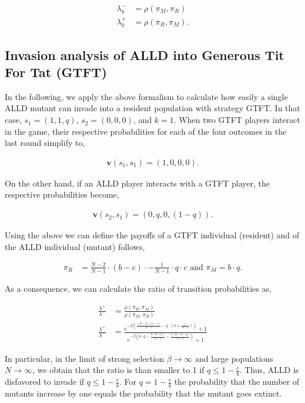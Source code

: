 \documentclass[11pt]{article}
\theoremstyle{plainCl1}
\theoremstyle{plainCl2}
\begin{document}
\begin{align*} 
  \lambda^-_k &\!=\!\rho(\pi_M, \pi_R) \\
  \lambda^+_k &\!=\!\rho(\pi_R, \pi_M).
\end{align*}

\subsection{Invasion analysis of ALLD into Generous Tit For Tat (GTFT)}

In the following, we apply the above formalism to calculate how easily a single
ALLD mutant can invade into a resident population with strategy GTFT. In that
case, \(s_1 = (1, 1, q)\), \(s_2 = (0, 0, 0)\), and \(k = 1\). When two GTFT
players interact in the game, their respective probabilities for each of the
four outcomes in the last round simplify to,

\begin{align*}
    \mathbf{v}(s_1, s_1) = (1, 0, 0, 0).
\end{align*}

On the other hand, if an ALLD player interacts with a GTFT player, the
respective probabilities become,

\begin{align*}
  \mathbf{v}(s_2, s_1) = (0, q, 0, (1 - q)).
\end{align*}

Using the above we can define the payoffs of a GTFT individual (resident)
and of the ALLD individual (mutant) follows,

\begin{align*}
  \displaystyle \pi_R & = \displaystyle \frac{N\!-\!2}{N-1}\cdot (b - c) \cdot -	\displaystyle\frac{1}{N-1}\cdot q \cdot c\text{ and } \displaystyle \pi_M  = \displaystyle b \cdot q.
\end{align*}

As a consequence, we can calculate the ratio of transition probabilities as,

\begin{align*}
    \frac{\lambda^{+}}{\lambda^{-}} & = \frac{\rho(\pi_R, \pi_M)}{\rho(\pi_M, \pi_R)} \\[0.5cm]
    \frac{\lambda^{+}}{\lambda^{-}} & = \frac{e^{-\beta \left(\frac{(N-2) (b-c)}{N-1} - q \cdot (b + \frac{c}{N-1})\right)}+1}
    {e^{-\beta\left(b \cdot q - \frac{b (N - 2)}{N-1} - \frac{c (N - 2 - q)}{N-1}\right)}+1}
\end{align*}

In particular, in the limit of strong selection \(\beta \rightarrow \infty\)
and large populations \(N \rightarrow \infty\), we obtain that the ratio is than
smaller to 1 if \(q \leq 1 - \frac{c}{b}\). Thus, ALLD is disfavored to invade
if \(q \leq 1 - \frac{c}{b}\). For \(q = 1 -\frac{c}{b}\) the probability that
the number of mutants increase by one equals the probability that the mutant
goes extinct.
\end{document}
